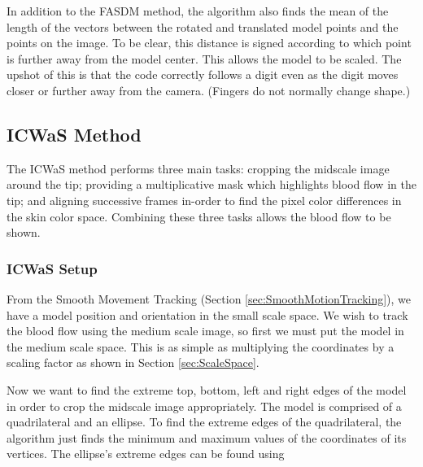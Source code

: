 In addition to the FASDM method, the algorithm also finds the mean of the length of the vectors between the rotated and translated model points and the points on the image. To be clear, this distance is signed according to which point is further away from the model center. This allows the model to be scaled. The upshot of this is that the code correctly follows a digit even as the digit moves closer or further away from the camera. (Fingers do not normally change shape.)
\clearpage
\subsection{ICWaS Method}\label{sec:ICWaS}
The ICWaS method performs three main tasks: cropping the midscale image around the tip; providing a multiplicative mask which highlights blood flow in the tip; and aligning successive frames in-order to find the pixel color differences in the skin color space. Combining these three tasks allows the blood flow to be shown.

\subsubsection{ICWaS Setup}\label{sec:ICWaSSetup}
From the Smooth Movement Tracking (Section \ref{sec:SmoothMotionTracking}), we have a model position and orientation in the small scale space. We wish to track the blood flow using the medium scale image, so first we must put the model in the medium scale space. This is as simple as multiplying the coordinates by a scaling factor as shown in Section \ref{sec:ScaleSpace}.

Now we want to find the extreme top, bottom, left and right edges of the model in order to crop the midscale image appropriately. The model is comprised of a quadrilateral and an ellipse. To find the extreme edges of the quadrilateral, the algorithm just finds the minimum and maximum values of the coordinates of its vertices. The ellipse's extreme edges can be found using

